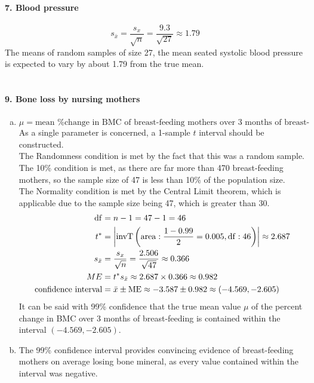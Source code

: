 \documentclass[../Homework]{subfiles}
\begin{document}
		\paragraph{7. Blood pressure}
			\[s_{\bar{x}} = \frac{s_x}{\sqrt{n}} = \frac{9.3}{\sqrt{27}} \approx 1.79\]
			The means of random samples of size 27, the mean seated systolic blood pressure is expected to vary by about 1.79 from the true mean. \\\\
		\paragraph{9. Bone loss by nursing mothers}
			\begin{enumerate}[a.]
				\item
					\[\mu = \text{mean \% change in BMC of breast-feeding mothers over 3 months of breast-feeding}\]
					As a single parameter is concerned, a 1-sample $t$ interval should be constructed. \\
					The Randomness condition is met by the fact that this was a random sample. \\
					The 10\% condition is met, as there are far more than 470 breast-feeding mothers, so the sample size of 47 is less than 10\% of the population size. \\
					The Normality condition is met by the Central Limit theorem, which is applicable due to the sample size being 47, which is greater than 30. \\
					\begin{align*}
						\operatorname{df} &= n - 1 = 47 - 1 = 46 \\
						t^* &= \left|\operatorname{invT}\left(\operatorname{area}: \frac{1 - 0.99}{2} = 0.005, \operatorname{df}: 46\right)\right| \approx 2.687 \\
						s_{\bar{x}} &= \frac{s_x}{\sqrt{n}} = \frac{2.506}{\sqrt{47}} \approx 0.366 \\
						ME &= t^*s_{\bar{x}} \approx 2.687 \times 0.366 \approx 0.982 \\
						\text{confidence interval} &= \bar{x} \pm \operatorname{ME} \approx -3.587 \pm 0.982 \approx (-4.569, -2.605)
					\end{align*}
					It can be said with 99\% confidence that the true mean value $\mu$ of the percent change in BMC over 3 months of breast-feeding is contained within the interval $(-4.569, -2.605)$. \\
				\item
					The 99\% confidence interval provides convincing evidence of breast-feeding mothers on average losing bone mineral, as every value contained within the interval was negative.
			\end{enumerate}
\end{document}
